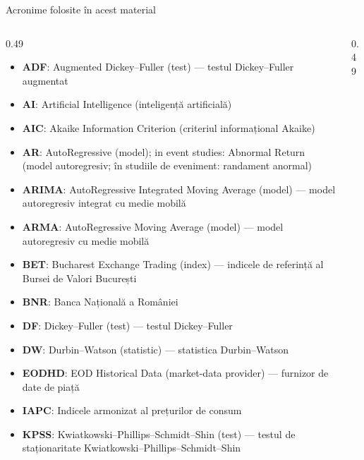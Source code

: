 {
\begin{frame}[noframenumbering]
    \titlepage
\end{frame}
}
\begin{frame}{Acronime folosite în acest material}
\begin{columns}[T]
\begin{column}{0.49\textwidth}
\begin{itemize}\setlength{\itemsep}{0pt}
    \item \textbf{ADF}: Augmented Dickey–Fuller (test) — testul Dickey–Fuller augmentat
    \item \textbf{AI}: Artificial Intelligence (inteligență artificială)
    \item \textbf{AIC}: Akaike Information Criterion (criteriul informațional Akaike)
    \item \textbf{AR}: AutoRegressive (model); in event studies: Abnormal Return (model autoregresiv; în studiile de eveniment: randament anormal)
    \item \textbf{ARIMA}: AutoRegressive Integrated Moving Average (model) — model autoregresiv integrat cu medie mobilă
    \item \textbf{ARMA}: AutoRegressive Moving Average (model) — model autoregresiv cu medie mobilă
    \item \textbf{BET}: Bucharest Exchange Trading (index) — indicele de referință al Bursei de Valori București
    \item \textbf{BNR}: Banca Națională a României
    \item \textbf{DF}: Dickey–Fuller (test) — testul Dickey–Fuller
    \item \textbf{DW}: Durbin–Watson (statistic) — statistica Durbin–Watson
    \item \textbf{EODHD}: EOD Historical Data (market-data provider) — furnizor de date de piață
    \item \textbf{IAPC}: Indicele armonizat al prețurilor de consum
    \item \textbf{KPSS}: Kwiatkowski–Phillips–Schmidt–Shin (test) — testul de staționaritate Kwiatkowski–Phillips–Schmidt–Shin
\end{itemize}
\end{column}
\begin{column}{0.49\textwidth}
\begin{itemize}\setlength{\itemsep}{0pt}

\end{itemize}
\end{column}
\end{columns}
\end{frame}
